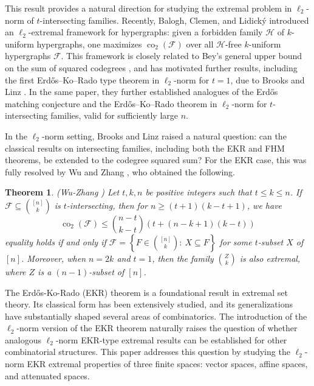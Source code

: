 \documentclass[11pt]{article}
\newtheorem{theorem}{Theorem}
\theoremstyle{definition}
\newcommand{\co}{\operatorname{co}_2}
\begin{document}
This result provides a natural direction for studying the extremal problem in $\ell_2$-norm  of $t$-intersecting families. Recently, Balogh, Clemen, and Lidick\'{y} \cite{Balogh2022} introduced an $\ell_2$-extremal framework for hypergraphs: given a forbidden family $\mathcal{H}$ of $k$-uniform hypergraphs, one maximizes $\co(\mathcal{F})$ over all $\mathcal{H}$-free $k$-uniform hypergraphs $\mathcal{F}$. This framework is closely related to Bey's general upper bound on the sum of squared codegrees \cite{Bey2003}, and has motivated further results, including the first Erd\H{o}s--Ko--Rado type theorem in $\ell_2$-norm for $t=1$, due to Brooks and Linz \cite{Brooks2023}. In the same paper, they further established analogues of the Erd\H{o}s matching conjecture and the  Erd\H{o}s--Ko--Rado theorem in $\ell_2$-norm for $t$-intersecting families, valid for sufficiently large $n$. 


In the $\ell_2$-norm setting, Brooks and Linz \cite{Brooks2023} raised a natural question: can the  classical results on intersecting families, including both the EKR and FHM theorems, be extended to the codegree squared sum? For the EKR case, this was fully resolved by Wu and Zhang \cite{WuZhang2026}, who obtained the following.

\begin{theorem}(Wu-Zhang \cite{WuZhang2026})
Let $t,k,n$ be positive integers such that $t \leq k \leq n$. If $\mathcal{F}\subseteq\binom{[n]}{k}$ is $t$-intersecting, then 
for $n\geq(t+1)(k-t+1)$, we have
\[
\co(\mathcal{F})\leq\binom{n-t}{k-t}(t+(n-k+1)(k-t))    
\]
equality holds if and only if $\mathcal{F}=\left\{F\in\binom{[n]}{k}: \ X\subseteq F\right\}$ for some $t$-subset $X$ of $[n]$. Moreover, when $n=2k$ and $t=1$, then the family $\binom{Z}{k}$ is also extremal, where $Z$ is a $(n-1)$-subset of $[n]$.
\end{theorem}

The Erd\H{o}s-Ko-Rado (EKR) theorem is a foundational result in extremal set theory. Its classical form has been extensively studied, and its generalizations have substantially shaped several areas of combinatorics. The introduction of the $\ell_2$-norm version of the EKR theorem naturally raises the question of whether analogous $\ell_2$-norm EKR-type extremal results can be established for other combinatorial structures. This paper addresses this question by studying the $\ell_2$-norm EKR extremal properties of three  finite spaces: vector spaces, affine spaces, and attenuated spaces. 
\end{document}
